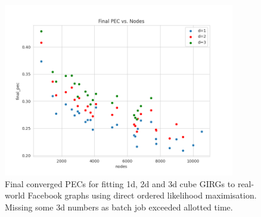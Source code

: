\begin{figure}
  \centering
  \includegraphics[width=0.9\textwidth]{figures/mcmc_ordered_final_pec.png}
  \caption{Final converged PECs for fitting 1d, 2d and 3d cube GIRGs to real-world Facebook graphs using direct ordered likelihood maximisation.
  Missing some 3d numbers as batch job exceeded allotted time.}
  \label{fig:converged_pecs}
\end{figure}




